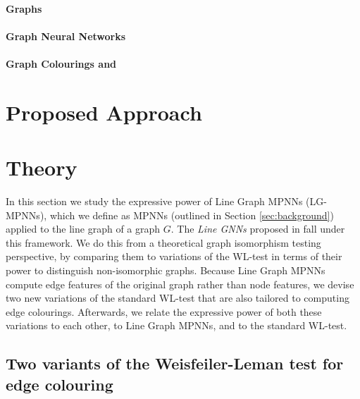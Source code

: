 \documentclass{article}
\begin{document}
\paragraph{Graphs}

\paragraph{Graph Neural Networks}

\paragraph{Graph Colourings and }




\section{Proposed Approach}




\section{Theory}


In this section we study the expressive power of Line Graph MPNNs (LG-MPNNs), which we define as MPNNs (outlined in Section \ref{sec:background}) applied to the line graph of a graph $G$.
The \emph{Line GNNs} proposed in \cite{cai2021line} fall under this framework.
We do this from a theoretical graph isomorphism testing perspective, by comparing them to variations of the WL-test in terms of their power to distinguish non-isomorphic graphs.
Because Line Graph MPNNs compute edge features of the original graph rather than node features, we devise two new variations of the standard WL-test that are also tailored to computing edge colourings. 
Afterwards, we relate the expressive power of both these variations to each other, to Line Graph MPNNs, and to the standard WL-test.


\subsection{Two variants of the Weisfeiler-Leman test for edge colouring}
\end{document}
